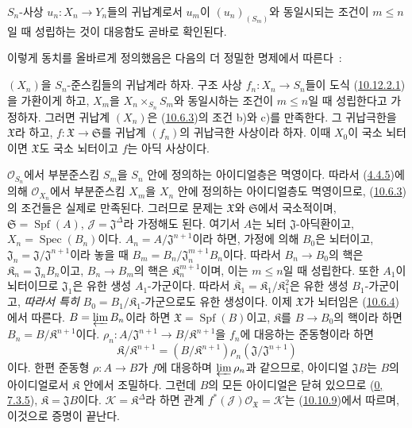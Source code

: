
$S_n$-사상 $u_n:X_n\to Y_n$들의 귀납계로서 $u_m$이
$(u_n)_{(S_m)}$와 동일시되는 조건이 $m\leq n$일 때 성립하는 것이
대응함도 곧바로 확인된다.

이렇게 동치를 올바르게 정의했음은 다음의 더 정밀한 명제에서 따른다~:

\begin{proposition}[10.12.3.1]
\label{I.10.12.3.1-ko}
$(X_n)$을 $S_n$-준스킴들의 귀납계라 하자. 구조 사상
$f_n:X_n\to S_n$들이 도식
(\hyperref[I.10.12.2.1-ko]{10.12.2.1})을 가환이게 하고, $X_m$을
$X_n\times_{S_n}S_m$와 동일시하는 조건이 $m\leq n$일 때 성립한다고
가정하자.
그러면 귀납계 $(X_n)$은 (\hyperref[I.10.6.3-ko]{10.6.3})의 조건
b)와 c)를 만족한다. 그 귀납극한을 $\mathfrak{X}$라 하고,
$f:\mathfrak{X}\to\mathfrak{S}$를 귀납계 $(f_n)$의 귀납극한 사상이라
하자. 이때 $X_0$이 국소 뇌터이면
$\mathfrak{X}$도 국소 뇌터이고 $f$는 아딕 사상이다.
\end{proposition}

$\mathscr{O}_{S_n}$에서 부분준스킴 $S_m$을 $S_n$ 안에 정의하는
아이디얼층은 멱영이다. 따라서 (\hyperref[I.4.4.5-ko]{4.4.5})에
의해 $\mathscr{O}_{X_n}$에서 부분준스킴 $X_m$을 $X_n$ 안에 정의하는
아이디얼층도 멱영이므로, (\hyperref[I.10.6.3-ko]{10.6.3})의 조건들은
실제로 만족된다. 그러므로 문제는 $\mathfrak{X}$와 $\mathfrak{S}$에서
국소적이며, $\mathfrak{S}=\operatorname{Spf}(A)$,
$\mathscr{J}=\mathfrak{J}^\Delta$라 가정해도 된다. 여기서 $A$는
뇌터 $\mathfrak{J}$-아딕환이고, $X_n=\operatorname{Spec}(B_n)$이다.
$A_n=A/\mathfrak{J}^{n+1}$이라 하면,
가정에 의해 $B_0$은 뇌터이고,
$\mathfrak{J}_n=\mathfrak{J}/\mathfrak{J}^{n+1}$이라 놓을 때
$B_m=B_n/\mathfrak{J}_n^{m+1}B_n$이다. 따라서 $B_n\to B_0$의 핵은
$\mathfrak{K}_n=\mathfrak{J}_nB_n$이고, $B_n\to B_m$의 핵은
$\mathfrak{K}_n^{m+1}$이며, 이는 $m\leq n$일 때 성립한다. 또한 $A_1$이
뇌터이므로 $\mathfrak{J}_1$은 유한 생성 $A_1$-가군이다. 따라서
$\overline{\mathfrak{K}}_1=\mathfrak{K}_1/\mathfrak{K}_1^2$은
유한 생성 $B_1$-가군이고, \emph{따라서 특히}
$B_0=B_1/\mathfrak{K}_1$-가군으로도 유한 생성이다. 이제
$\mathfrak{X}$가 뇌터임은 (\hyperref[I.10.6.4-ko]{10.6.4})에서
따른다. $B=\varprojlim B_n$이라 하면
$\mathfrak{X}=\operatorname{Spf}(B)$이고, $\mathfrak{K}$를
$B\to B_0$의 핵이라 하면 $B_n=B/\mathfrak{K}^{n+1}$이다.
$\rho_n:A/\mathfrak{J}^{n+1}\to B/\mathfrak{K}^{n+1}$을 $f_n$에
대응하는 준동형이라 하면
\[
  \mathfrak{K}/\mathfrak{K}^{n+1}
  =(B/\mathfrak{K}^{n+1})\rho_n(\mathfrak{J}/\mathfrak{J}^{n+1})
\]
이다. 한편 준동형 $\rho:A\to B$가 $f$에 대응하며
$\varprojlim\rho_n$과 같으므로, 아이디얼 $\mathfrak{J}B$는 $B$의
아이디얼로서 $\mathfrak{K}$ 안에서 조밀하다. 그런데 $B$의 모든
아이디얼은 닫혀 있으므로 (\hyperref[0.7.3.5-ko]{0, 7.3.5}),
$\mathfrak{K}=\mathfrak{J}B$이다.
$\mathscr{K}=\mathfrak{K}^\Delta$라 하면 관계
$f^*(\mathscr{J})\mathscr{O}_{\mathfrak{X}}=\mathscr{K}$는
(\hyperref[I.10.10.9-ko]{10.10.9})에서 따르며, 이것으로 증명이 끝난다.

